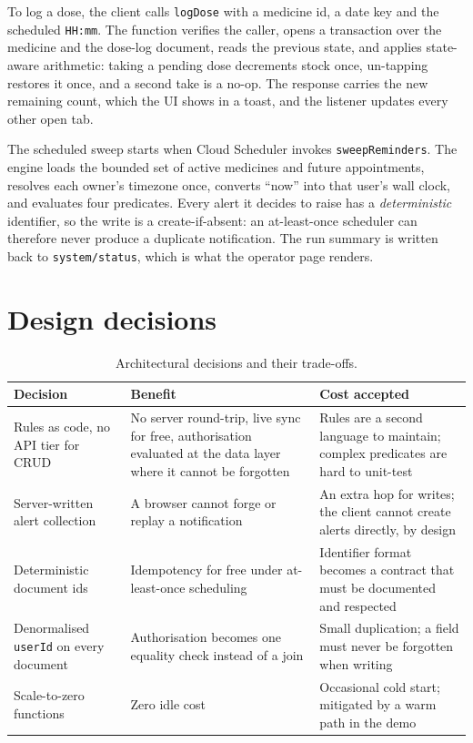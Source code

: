 \documentclass[11pt,a4paper]{report}
\begin{document}
To log a dose, the client calls \texttt{logDose} with a medicine id, a date key and the
scheduled \texttt{HH:mm}. The function verifies the caller, opens a transaction over the medicine and
the dose-log document, reads the previous state, and applies state-aware arithmetic: taking a pending
dose decrements stock once, un-tapping restores it once, and a second take is a no-op. The response
carries the new remaining count, which the UI shows in a toast, and the listener updates every other
open tab.

The scheduled sweep starts when Cloud Scheduler invokes \texttt{sweepReminders}. The engine loads the
bounded set of active medicines and future appointments, resolves each owner's timezone once, converts
``now'' into that user's wall clock, and evaluates four predicates. Every alert it decides to raise has
a \emph{deterministic} identifier, so the write is a create-if-absent: an at-least-once scheduler can
therefore never produce a duplicate notification. The run summary is written back to
\texttt{system/status}, which is what the operator page renders.

\section{Design decisions}

\begin{table}[h]
\centering
\caption{Architectural decisions and their trade-offs.}
\label{tab:decisions}
\small
\begin{tabularx}{\textwidth}{@{}>{\raggedright\arraybackslash}p{3.4cm} X X@{}}
\toprule
\textbf{Decision} & \textbf{Benefit} & \textbf{Cost accepted} \\
\midrule
Rules as code, no API tier for CRUD & No server round-trip, live sync for free, authorisation evaluated at the data layer where it cannot be forgotten & Rules are a second language to maintain; complex predicates are hard to unit-test \\
Server-written alert collection & A browser cannot forge or replay a notification & An extra hop for writes; the client cannot create alerts directly, by design \\
Deterministic document ids & Idempotency for free under at-least-once scheduling & Identifier format becomes a contract that must be documented and respected \\
Denormalised \texttt{userId} on every document & Authorisation becomes one equality check instead of a join & Small duplication; a field must never be forgotten when writing \\
Scale-to-zero functions & Zero idle cost & Occasional cold start; mitigated by a warm path in the demo \\
\bottomrule
\end{tabularx}
\end{table}
\end{document}

